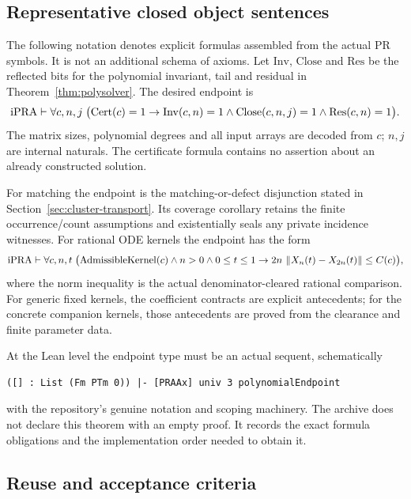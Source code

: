 \subsection{Representative closed object sentences}

The following notation denotes explicit formulas assembled from the actual PR symbols. It is not an additional schema of axioms. Let \(\mathrm{Inv}\), \(\mathrm{Close}\) and \(\mathrm{Res}\) be the reflected bits for the polynomial invariant, tail and residual in Theorem~\ref{thm:polysolver}. The desired endpoint is
\begin{equation}\label{eq:objectpoly}
 \mathrm{iPRA}\vdash\forall c,n,j\;
 \bigl(\mathrm{Cert}(c)=1\to
   \mathrm{Inv}(c,n)=1\wedge\mathrm{Close}(c,n,j)=1
       \wedge\mathrm{Res}(c,n)=1\bigr).
\end{equation}
The matrix sizes, polynomial degrees and all input arrays are decoded from \(c\); \(n,j\) are internal naturals. The certificate formula contains no assertion about an already constructed solution.

For matching the endpoint is the matching-or-defect disjunction stated in Section~\ref{sec:cluster-transport}. Its coverage corollary retains the finite occurrence/count assumptions and existentially seals any private incidence witnesses. For rational ODE kernels the endpoint has the form
\[
 \mathrm{iPRA}\vdash\forall c,n,t\;
 \bigl(\mathrm{AdmissibleKernel}(c)\wedge n>0\wedge0\le t\le1
 \to 2n\,\left\lVert X_n(t)-X_{2n}(t)\right\rVert\le C(c)\bigr),
\]
where the norm inequality is the actual denominator-cleared rational comparison. For generic fixed kernels, the coefficient contracts are explicit antecedents; for the concrete companion kernels, those antecedents are proved from the clearance and finite parameter data.

At the Lean level the endpoint type must be an actual sequent, schematically
\begin{lstlisting}
([] : List (Fm PTm 0)) |- [PRAAx] univ 3 polynomialEndpoint
\end{lstlisting}
with the repository's genuine notation and scoping machinery. The archive does not declare this theorem with an empty proof. It records the exact formula obligations and the implementation order needed to obtain it.

\subsection{Reuse and acceptance criteria}

